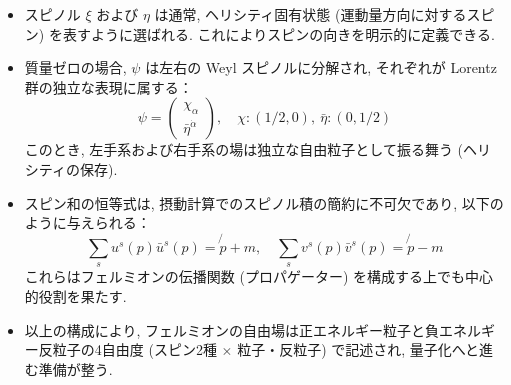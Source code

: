 \documentclass[a4paper,12pt]{article}
\begin{document}
\begin{itemize}
  \item スピノル $\xi$ および $\eta$ は通常, ヘリシティ固有状態 (運動量方向に対するスピン) を表すように選ばれる. これによりスピンの向きを明示的に定義できる.

  \item 質量ゼロの場合, $\psi$ は左右の Weyl スピノルに分解され, それぞれが Lorentz 群の独立な表現に属する：
  \begin{equation*}
    \psi = 
    \begin{pmatrix}
      \chi_\alpha \\
      \bar{\eta}^{\dot{\alpha}}
    \end{pmatrix}, \quad \chi : (1/2, 0),\ \bar{\eta} : (0, 1/2)
  \end{equation*}
  このとき, 左手系および右手系の場は独立な自由粒子として振る舞う (ヘリシティの保存).

  \item スピン和の恒等式は, 摂動計算でのスピノル積の簡約に不可欠であり, 以下のように与えられる：
  \begin{equation*}
    \sum_s u^s(p)\bar{u}^s(p) = \not{p} + m, \quad
    \sum_s v^s(p)\bar{v}^s(p) = \not{p} - m
  \end{equation*}
  これらはフェルミオンの伝播関数 (プロパゲーター) を構成する上でも中心的役割を果たす.

  \item 以上の構成により, フェルミオンの自由場は正エネルギー粒子と負エネルギー反粒子の4自由度 (スピン2種 $\times$ 粒子・反粒子) で記述され, 量子化へと進む準備が整う.
\end{itemize}

\newpage
\color{black}
\end{document}
